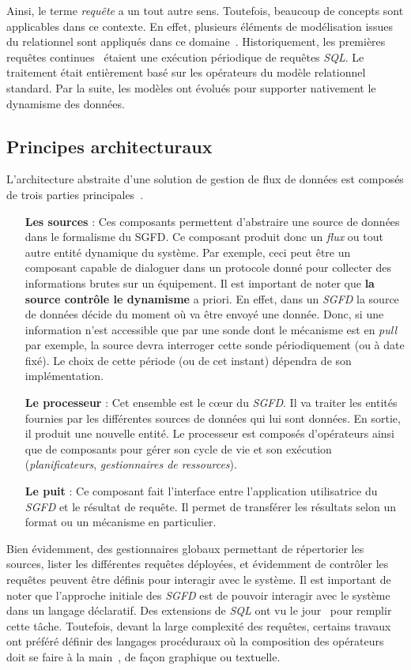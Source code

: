 Ainsi, le terme \textit{requête} a un tout autre sens. Toutefois, beaucoup de concepts sont applicables dans ce contexte. En effet, plusieurs éléments de modélisation issues du relationnel sont appliqués dans ce domaine~\cite{Arasu:semantic}. Historiquement, les premières requêtes continues~\cite{Terry:tapestry} étaient une exécution périodique de requêtes \textit{SQL}. Le traitement était entièrement basé sur les opérateurs du modèle relationnel standard. Par la suite, les modèles ont évolués pour supporter nativement le dynamisme des données.

\subsection{Principes architecturaux}
L'architecture abstraite d'une solution de gestion de flux de données est composés de trois parties principales~\cite{Duller:virtualdsms}.
\begin{itemize}
 \item[\textbf{Les sources}] : Ces composants permettent d'abstraire une source de données dans le formalisme du SGFD. Ce composant produit donc un \textit{flux} ou tout autre entité dynamique du système. Par exemple, ceci peut être un composant capable de dialoguer dans un protocole donné pour collecter des informations brutes sur un équipement. Il est important de noter que \textbf{la source contrôle le dynamisme} a priori. En effet, dans un \textit{SGFD} la source de données décide du moment où va être envoyé une donnée. Donc, si une information n'est accessible que par une sonde dont le mécanisme est en \textit{pull} par exemple, la source devra interroger cette sonde périodiquement (ou à date fixé). Le choix de cette période (ou de cet instant) dépendra de son implémentation.
 \item[\textbf{Le processeur}] : Cet ensemble est le cœur du \textit{SGFD}. Il va traiter les entités fournies par les différentes sources de données qui lui sont données. En sortie, il produit une nouvelle entité. Le processeur est composés d'opérateurs ainsi que de composants pour gérer son cycle de vie et son exécution (\textit{planificateurs}, \textit{gestionnaires de ressources}).
 \item[\textbf{Le puit}] : Ce composant fait l'interface entre l'application utilisatrice du \textit{SGFD} et le résultat de requête. Il permet de transférer les résultats selon un format ou un mécanisme en particulier.
\end{itemize}
Bien évidemment, des gestionnaires globaux permettant de répertorier les sources, lister les différentes requêtes déployées, et évidemment de contrôler les requêtes peuvent être définis pour interagir avec le système. Il est important de noter que l'approche initiale des \textit{SGFD} est de pouvoir interagir avec le système dans un langage déclaratif. Des extensions de \textit{SQL} ont vu le jour~\cite{Arasu:cql, Chandrasekaran:telegraphcq} pour remplir cette tâche. Toutefois, devant la large complexité des requêtes, certains travaux ont préféré définir des langages procéduraux où la composition des opérateurs doit se faire à la main~\cite{Abadi:aurora, Gurgen:sstreamware}, de façon graphique ou textuelle.

